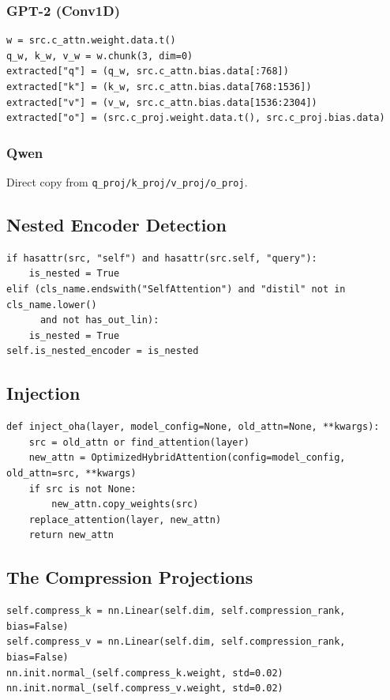 \subsubsection{GPT-2 (Conv1D)}

\begin{lstlisting}
w = src.c_attn.weight.data.t()
q_w, k_w, v_w = w.chunk(3, dim=0)
extracted["q"] = (q_w, src.c_attn.bias.data[:768])
extracted["k"] = (k_w, src.c_attn.bias.data[768:1536])
extracted["v"] = (v_w, src.c_attn.bias.data[1536:2304])
extracted["o"] = (src.c_proj.weight.data.t(), src.c_proj.bias.data)
\end{lstlisting}

\subsubsection{Qwen}

Direct copy from \texttt{q\_proj/k\_proj/v\_proj/o\_proj}.

\subsection{Nested Encoder Detection}

\begin{lstlisting}
if hasattr(src, "self") and hasattr(src.self, "query"):
    is_nested = True
elif (cls_name.endswith("SelfAttention") and "distil" not in cls_name.lower()
      and not has_out_lin):
    is_nested = True
self.is_nested_encoder = is_nested
\end{lstlisting}

\subsection{Injection}

\begin{lstlisting}
def inject_oha(layer, model_config=None, old_attn=None, **kwargs):
    src = old_attn or find_attention(layer)
    new_attn = OptimizedHybridAttention(config=model_config, old_attn=src, **kwargs)
    if src is not None:
        new_attn.copy_weights(src)
    replace_attention(layer, new_attn)
    return new_attn
\end{lstlisting}

\subsection{The Compression Projections}

\begin{lstlisting}
self.compress_k = nn.Linear(self.dim, self.compression_rank, bias=False)
self.compress_v = nn.Linear(self.dim, self.compression_rank, bias=False)
nn.init.normal_(self.compress_k.weight, std=0.02)
nn.init.normal_(self.compress_v.weight, std=0.02)
\end{lstlisting}

